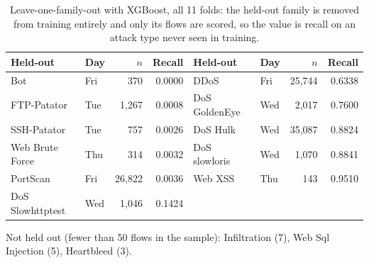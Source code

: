 \begin{table}[htbp]
\centering
\caption{Leave-one-family-out with XGBoost, all 11 folds: the held-out family is removed from training entirely and only its flows are scored, so the value is recall on an attack type never seen in training.}
\label{tab:loo}
\scriptsize
\begin{tabular}{llrr|llrr}
\hline
Held-out & Day & $n$ & Recall & Held-out & Day & $n$ & Recall \\
\hline
Bot & Fri & 370 & 0.0000 & DDoS & Fri & 25,744 & 0.6338 \\
FTP-Patator & Tue & 1,267 & 0.0008 & DoS GoldenEye & Wed & 2,017 & 0.7600 \\
SSH-Patator & Tue & 757 & 0.0026 & DoS Hulk & Wed & 35,087 & 0.8824 \\
Web Brute Force & Thu & 314 & 0.0032 & DoS slowloris & Wed & 1,070 & 0.8841 \\
PortScan & Fri & 26,822 & 0.0036 & Web XSS & Thu & 143 & 0.9510 \\
DoS Slowhttptest & Wed & 1,046 & 0.1424 &  &  &  &  \\
\hline
\end{tabular}
\par\smallskip\footnotesize Not held out (fewer than 50 flows in the sample): Infiltration (7), Web Sql Injection (5), Heartbleed (3).
\end{table}
